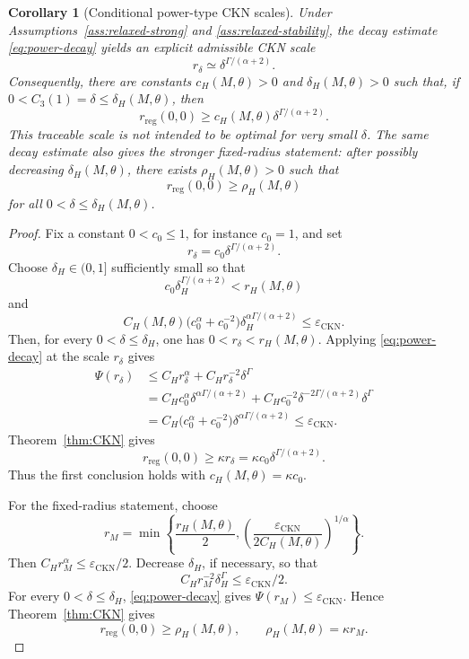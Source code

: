\documentclass[pdflatex,sn-mathphys-num]{sn-jnl}
\numberwithin{equation}{section}
\theoremstyle{thmstyleone}
\newtheorem{corollary}[theorem]{Corollary}
\theoremstyle{thmstylethree}
\newcommand{\eps}{\varepsilon}
\newcommand{\reg}{\mathrm{reg}}
\newcommand{\CKN}{\mathrm{CKN}}
\begin{document}
\begin{corollary}[Conditional power-type CKN scales]
\label{cor:power-radius}
Under Assumptions~\ref{ass:relaxed-strong} and \ref{ass:relaxed-stability}, the decay estimate \eqref{eq:power-decay} yields an explicit admissible CKN scale
\[
        r_\delta\simeq \delta^{\Gamma/(\alpha+2)}.
\]
Consequently, there are constants \(c_H(M,\theta)>0\) and \(\delta_H(M,\theta)>0\) such that, if \(0<C_3(1)=\delta\le\delta_H(M,\theta)\), then
\[
        r_{\reg}(0,0)
        \ge c_H(M,\theta)\delta^{\Gamma/(\alpha+2)}.
\]
This traceable scale is not intended to be optimal for very small \(\delta\).  The same decay estimate also gives the stronger fixed-radius statement: after possibly decreasing \(\delta_H(M,\theta)\), there exists \(\rho_H(M,\theta)>0\) such that
\[
        r_{\reg}(0,0)
        \ge \rho_H(M,\theta)
\]
for all \(0<\delta\le\delta_H(M,\theta)\).
\end{corollary}

\begin{proof}
Fix a constant \(0<c_0\le 1\), for instance \(c_0=1\), and set
\[
        r_\delta=c_0\delta^{\Gamma/(\alpha+2)}.
\]
Choose \(\delta_H\in(0,1]\) sufficiently small so that
\[
        c_0\delta_H^{\Gamma/(\alpha+2)}<r_H(M,\theta)
\]
and
\[
        C_H(M,\theta)\bigl(c_0^\alpha+c_0^{-2}\bigr)
        \delta_H^{\alpha\Gamma/(\alpha+2)}
        \le \eps_{\CKN}.
\]
Then, for every \(0<\delta\le\delta_H\), one has \(0<r_\delta<r_H(M,\theta)\).  Applying \eqref{eq:power-decay} at the scale \(r_\delta\) gives
\[
\begin{aligned}
        \Psi(r_\delta)
        &\le C_H r_\delta^\alpha+C_Hr_\delta^{-2}\delta^\Gamma  \\
        &= C_Hc_0^\alpha\delta^{\alpha\Gamma/(\alpha+2)}
        +C_Hc_0^{-2}\delta^{-2\Gamma/(\alpha+2)}\delta^\Gamma  \\
        &= C_H\bigl(c_0^\alpha+c_0^{-2}\bigr)
        \delta^{\alpha\Gamma/(\alpha+2)}
        \le \eps_{\CKN}.
\end{aligned}
\]
Theorem~\ref{thm:CKN} gives
\[
        r_{\reg}(0,0)\ge \kappa r_\delta
        =\kappa c_0\delta^{\Gamma/(\alpha+2)}.
\]
Thus the first conclusion holds with \(c_H(M,\theta)=\kappa c_0\).

For the fixed-radius statement, choose
\[
        r_M=\min\left\{\frac{r_H(M,\theta)}2,
        \left(\frac{\eps_{\CKN}}{2C_H(M,\theta)}\right)^{1/\alpha}\right\}.
\]
Then \(C_Hr_M^\alpha\le\eps_{\CKN}/2\).  Decrease \(\delta_H\), if necessary, so that
\[
        C_Hr_M^{-2}\delta_H^\Gamma\le\eps_{\CKN}/2.
\]
For every \(0<\delta\le\delta_H\), \eqref{eq:power-decay} gives \(\Psi(r_M)\le\eps_{\CKN}\).  Hence Theorem~\ref{thm:CKN} gives
\[
        r_{\reg}(0,0)\ge \rho_H(M,\theta),
        \qquad \rho_H(M,\theta)=\kappa r_M.
\]
\end{proof}
\end{document}
